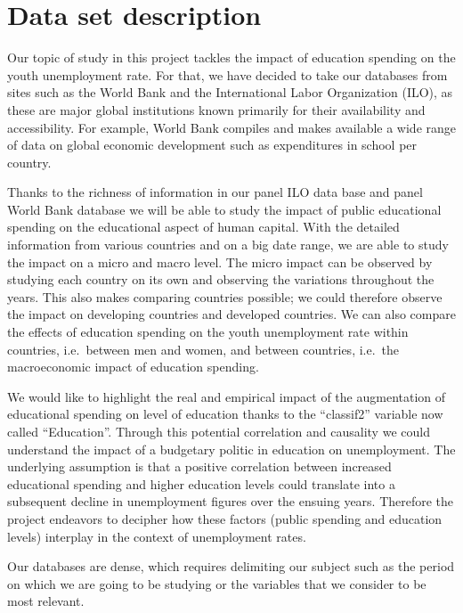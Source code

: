 \documentclass[
  letterpaper,
  DIV=11,
  numbers=noendperiod]{scrartcl}
\begin{document}
\hypertarget{data-set-description}{%
\section{Data set description}\label{data-set-description}}

Our topic of study in this project tackles the impact of education
spending on the youth unemployment rate. For that, we have decided to
take our databases from sites such as the World Bank and the
International Labor Organization (ILO), as these are major global
institutions known primarily for their availability and accessibility.
For example, World Bank compiles and makes available a wide range of
data on global economic development such as expenditures in school per
country.

Thanks to the richness of information in our panel ILO data base and
panel World Bank database we will be able to study the impact of public
educational spending on the educational aspect of human capital. With
the detailed information from various countries and on a big date range,
we are able to study the impact on a micro and macro level. The micro
impact can be observed by studying each country on its own and observing
the variations throughout the years. This also makes comparing countries
possible; we could therefore observe the impact on developing countries
and developed countries. We can also compare the effects of education
spending on the youth unemployment rate within countries, i.e.~between
men and women, and between countries, i.e.~the macroeconomic impact of
education spending.

We would like to highlight the real and empirical impact of the
augmentation of educational spending on level of education thanks to the
``classif2'' variable now called ``Education''. Through this potential
correlation and causality we could understand the impact of a budgetary
politic in education on unemployment. The underlying assumption is that
a positive correlation between increased educational spending and higher
education levels could translate into a subsequent decline in
unemployment figures over the ensuing years. Therefore the project
endeavors to decipher how these factors (public spending and education
levels) interplay in the context of unemployment rates.

Our databases are dense, which requires delimiting our subject such as
the period on which we are going to be studying or the variables that we
consider to be most relevant.
\end{document}
